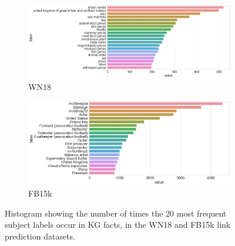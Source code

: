 \begin{figure}
	\begin{subfigure}[b]{.5\linewidth}
   		\centering
    		\includegraphics[width=1.0\linewidth, height=0.7\linewidth]{WN18_Subject_Counts}
		\captionsetup{justification=centering}
		\caption{WN18}
	\end{subfigure}
	\begin{subfigure}[b]{.5\linewidth}
   		\centering
		\includegraphics[width=1.0\linewidth, height=0.7\linewidth]{FB15k_Subject_Counts}
		\captionsetup{justification=centering}
		\caption{FB15k}
	\end{subfigure}
	\captionsetup{justification=centering}
	\caption{Histogram showing the number of times the 20 most frequent subject labels occur in KG facts, in the WN18 and FB15k link prediction datasets.}
\end{figure}


